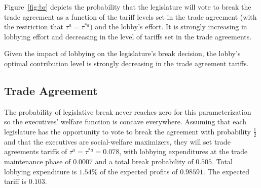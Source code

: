 \documentclass[10pt]{article}
\begin{document}

Figure~\ref{fig:br} depicts the probability that the legislature will vote to break the trade agreement as a function of the tariff levels set in the trade agreement (with the restriction that $\tau^a = \tau^{*a}$) and the lobby's effort. It is strongly increasing in lobbying effort and decreasing in the level of tariffs set in the trade agreements.

Given the impact of lobbying on the legislature's break decision, the lobby's optimal contribution level is strongly decreasing in the trade agreement tariffs.%

\subsection{Trade Agreement}
The probability of legislative break never reaches zero for this parameterization so the executives' welfare function is concave everywhere. Assuming that each legislature has the opportunity to vote to break the agreement with probability $\frac{1}{2}$ and that the executives are social-welfare maximizers, they will set trade agreements tariffs of $\tau^a = \tau^{*a} = 0.078$, with lobbying expenditures at the trade maintenance phase of $0.0007$ and a total break probability of $0.505$. Total lobbying expenditure is $1.54\%$ of the expected profits of $0.98591$. The expected tariff is $0.103$.
\end{document}
